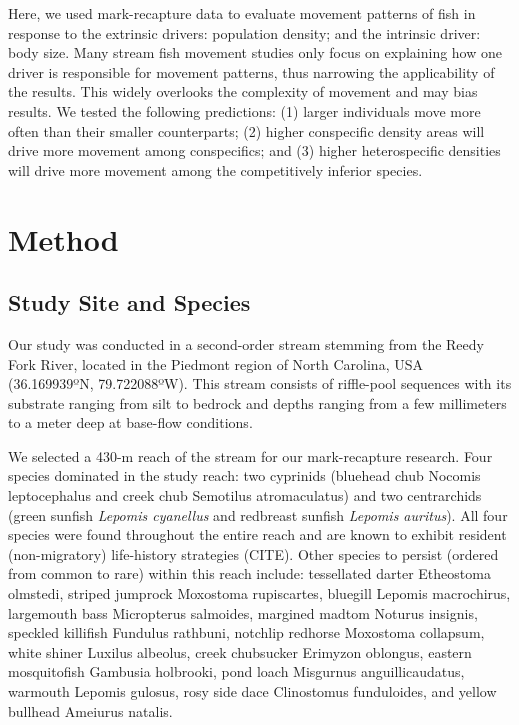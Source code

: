 \documentclass[11pt, class=article, crop=false]{standalone}
\begin{document}
Here, we used mark-recapture data to evaluate movement patterns of fish in response to the extrinsic drivers: population density; and the intrinsic driver: body size. Many stream fish movement studies only focus on explaining how one driver is responsible for movement patterns, thus narrowing the applicability of the results. This widely overlooks the complexity of movement and may bias results. We tested the following predictions: (1) larger individuals move more often than their smaller counterparts; (2) higher conspecific density areas will drive more movement among conspecifics; and (3) higher heterospecific densities will drive more movement among the competitively inferior species.

\section{Method}

\subsection{Study Site and Species}

Our study was conducted in a second-order stream stemming from the Reedy Fork River, located in the Piedmont region of North Carolina, USA (36.169939ºN, 79.722088ºW). This stream consists of riffle-pool sequences with its substrate ranging from silt to bedrock and depths ranging from a few millimeters to a meter deep at base-flow conditions. 

We selected a 430-m reach of the stream for our mark-recapture research. Four species dominated in the study reach: two cyprinids (bluehead chub Nocomis leptocephalus and creek chub Semotilus atromaculatus) and two centrarchids (green sunfish \textit{Lepomis cyanellus} and redbreast sunfish \textit{Lepomis auritus}). All four species were found throughout the entire reach and are known to exhibit resident (non-migratory) life-history strategies (CITE). Other species to persist (ordered from common to rare) within this reach include: tessellated darter Etheostoma olmstedi, striped jumprock Moxostoma rupiscartes, bluegill Lepomis macrochirus, largemouth bass Micropterus salmoides, margined madtom Noturus insignis, speckled killifish Fundulus rathbuni, notchlip redhorse Moxostoma collapsum, white shiner Luxilus albeolus, creek chubsucker Erimyzon oblongus, eastern mosquitofish Gambusia holbrooki, pond loach Misgurnus anguillicaudatus, warmouth Lepomis gulosus, rosy side dace Clinostomus funduloides, and yellow bullhead Ameiurus natalis. 
\end{document}
